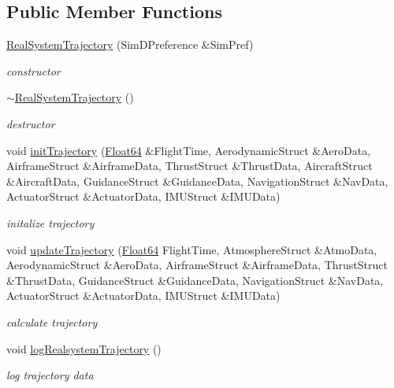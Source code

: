 \subsection*{Public Member Functions}
\begin{DoxyCompactItemize}
\item 
\hyperlink{class_real_system_trajectory_acfb42e8dbeadf71ce22d31ed51f0e6c0}{Real\+System\+Trajectory} (Sim\+D\+Preference \&Sim\+Pref)
\begin{DoxyCompactList}\small\item\em constructor \end{DoxyCompactList}\item 
\hyperlink{class_real_system_trajectory_a6ae4a18127c674dd4926ecc7ff92487e}{$\sim$\+Real\+System\+Trajectory} ()
\begin{DoxyCompactList}\small\item\em destructor \end{DoxyCompactList}\item 
void \hyperlink{class_real_system_trajectory_a41ae049eeff69ea6b9daef8027a142a3}{init\+Trajectory} (\hyperlink{group___tools_ga3f1431cb9f76da10f59246d1d743dc2c}{Float64} \&Flight\+Time, Aerodynamic\+Struct \&Aero\+Data, Airframe\+Struct \&Airframe\+Data, Thrust\+Struct \&Thrust\+Data, Aircraft\+Struct \&Aircraft\+Data, Guidance\+Struct \&Guidance\+Data, Navigation\+Struct \&Nav\+Data, Actuator\+Struct \&Actuator\+Data, I\+M\+U\+Struct \&I\+M\+U\+Data)
\begin{DoxyCompactList}\small\item\em initalize trajectory \end{DoxyCompactList}\item 
void \hyperlink{class_real_system_trajectory_a16cace4a95283499ffe59dccabff4c68}{update\+Trajectory} (\hyperlink{group___tools_ga3f1431cb9f76da10f59246d1d743dc2c}{Float64} Flight\+Time, Atmosphere\+Struct \&Atmo\+Data, Aerodynamic\+Struct \&Aero\+Data, Airframe\+Struct \&Airframe\+Data, Thrust\+Struct \&Thrust\+Data, Guidance\+Struct \&Guidance\+Data, Navigation\+Struct \&Nav\+Data, Actuator\+Struct \&Actuator\+Data, I\+M\+U\+Struct \&I\+M\+U\+Data)
\begin{DoxyCompactList}\small\item\em calculate trajectory \end{DoxyCompactList}\item 
void \hyperlink{class_real_system_trajectory_a964468d420db558844a4a3646e99d3b1}{log\+Realsystem\+Trajectory} ()
\begin{DoxyCompactList}\small\item\em log trajectory data \end{DoxyCompactList}\end{DoxyCompactItemize}


